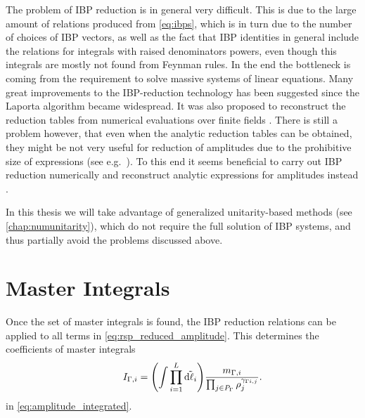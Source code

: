 The problem of IBP reduction is in general very difficult.
This is due to the large amount of relations produced from \cref{eq:ibps},
which is in turn due to the number of choices of IBP vectors, as well as the fact that IBP identities
in general include the relations for integrals with raised denominators powers, even
though this integrals are mostly not found from Feynman rules.
In the end the bottleneck is coming from the requirement to solve massive systems of linear equations.
Many great improvements to the IBP-reduction technology has been suggested
\cite{Gluza:2010ws,Schabinger:2011dz,Larsen:2015ped,Bern:2017gdk,Chawdhry:2018awn,Badger:2008cm,Kosower:2018obg,Mastrolia:2018uzb,Frellesvig:2019kgj,Frellesvig:2019uqt,Bendle2019}
since the Laporta algorithm became widespread.
It was also proposed to reconstruct the reduction tables from
numerical evaluations over finite fields \cite{vonManteuffel:2014ixa,Peraro:2016wsq,Peraro:2019svx,Klappert:2019emp,Smirnov:2019qkx}.
There is still a problem however,
that even when the analytic reduction tables can be obtained,
they might be not very useful for reduction of amplitudes due
to the prohibitive size of expressions (see e.g.\ \cite{Chawdhry:2018awn,Bendle2019}).
To this end it seems beneficial to carry out IBP reduction numerically and reconstruct
analytic expressions for amplitudes instead \cite{Badger:2018enw,Chicherin:2018yne,Badger:2019djh}.

In this thesis we will take advantage of generalized unitarity-based methods (see \cref{chap:numunitarity}),
which do not require the full solution of IBP systems, and thus
partially avoid the problems discussed above.


\section{Master Integrals}

Once the set of master integrals is found, the IBP reduction relations can be applied 
to all terms in \cref{eq:rsp_reduced_amplitude}.
This determines the coefficients of master integrals
\begin{equation} \label{eq:master_integrals}
    \qquad I_{\Gamma,i} = 
    \qty(\int \prod_{i=1}^{L} \tilde{\dd{\ell_i}}) \frac{m_{\Gamma,i}}{\prod_{j\in P_\Gamma} \rho_j^{\gamma_{\Gamma i,j}}}.
\end{equation}
in \cref{eq:amplitude_integrated}.

